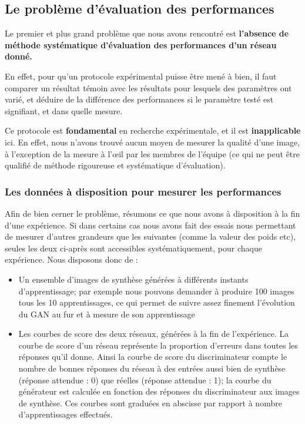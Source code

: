 \subsection{Le problème d'évaluation des performances}

Le premier et plus grand problème que nous avons rencontré est \textbf{l'absence de méthode systématique d'évaluation des performances d'un réseau donné.}

En effet, pour qu'un protocole expérimental puisse être mené à bien, il faut comparer un résultat témoin avec les résultats pour lesquels des paramètres ont varié, et déduire de la différence des performances si le paramètre testé est signifiant, et dans quelle mesure.

Ce protocole est \textbf{fondamental} en recherche expérimentale, et il est \textbf{inapplicable} ici. En effet, nous n'avons trouvé aucun moyen de mesurer la qualité d'une image, à l'exception de la mesure à l’œil par les membres de l'équipe (ce qui ne peut être qualifié de méthode rigoureuse et systématique d'évaluation). 

\subsubsection{Les données à disposition pour mesurer les performances}

Afin de bien cerner le problème, résumons ce que nous avons à disposition à la fin d'une expérience. Si dans certains cas nous avons fait des essais nous permettant de mesurer d'autres grandeurs que les suivantes (comme la valeur des poids etc), seules les deux ci-après sont accessibles systématiquement, pour chaque expérience.
Nous disposons donc de :

\begin{itemize}
  \item Un ensemble d'images de synthèse générées à différents instants d'apprentissage; par exemple nous pouvons demander à produire 100 images tous les 10 apprentissages, ce qui permet de suivre assez finement l'évolution du GAN au fur et à mesure de son apprentissage
  \item Les courbes de score des deux réseaux, générées à la fin de l'expérience. La courbe de score d'un réseau représente la proportion d'erreurs dans toutes les réponses qu'il donne. Ainsi la courbe de score du discriminateur compte le nombre de bonnes réponses du réseau à des entrées aussi bien de synthèse (réponse attendue : 0) que réelles (réponse attendue : 1); la courbe du générateur est calculée en fonction des réponses du discriminateur aux images de synthèse. Ces courbes sont graduées en abscisse par rapport à nombre d'apprentissages effectués.
\end{itemize}

